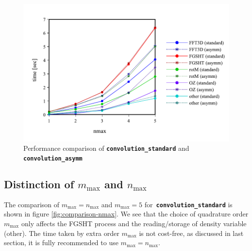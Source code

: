 \begin{figure}[H]
\begin{centering}
\includegraphics[bb=0bp 20bp 648bp 268bp,width=1\columnwidth]{_figure/results/asymm}
\par\end{centering}
\caption[Performance comparison of ``convolution\_standard'' and ``convolution\_asymm'']{Performance comparison of \texttt{\textbf{convolution\_standard}}
and \texttt{\textbf{convolution\_asymm\label{fig:comparison-asymm}}}}
\end{figure}


\subsection{Distinction of $m_{\max}$ and $n_{\max}$}

The comparison of $m_{\max}=n_{\max}$ and $m_{\max}=5$ for\texttt{\textbf{
convolution\_standard}} is shown in figure \ref{fig:comparison-nmax}.
We see that the choice of quadrature order $m_{\max}$ only affects
the \acs{FGSHT} process and the reading/storage of density variable
(other). The time taken by extra order $m_{\max}$ is not cost-free,
as discussed in last section, it is fully recommended to use $m_{\max}=n_{\max}$.

